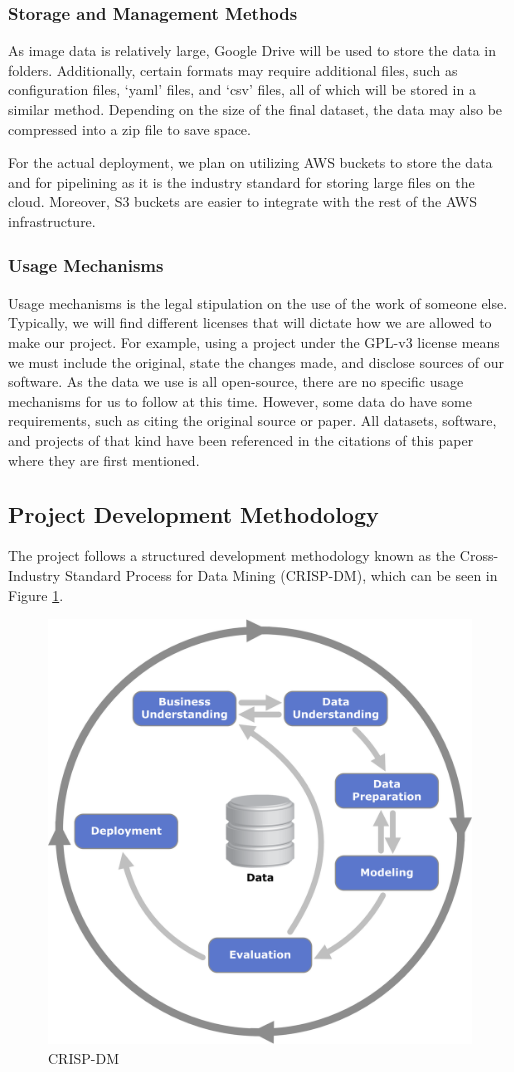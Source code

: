 \documentclass[stu,12pt,floatsintext]{apa7}
\begin{document}
\subsubsection{Storage and Management Methods}
As image data is relatively large, Google Drive will be used to store the data in folders. Additionally, certain formats may require additional files, such as configuration files, `yaml' files, and `csv' files, all of which will be stored in a similar method. Depending on the size of the final dataset, the data may also be compressed into a zip file to save space.

For the actual deployment, we plan on utilizing AWS buckets to store the data and for pipelining as it is the industry standard for storing large files on the cloud. Moreover, S3 buckets are easier to integrate with the rest of the AWS infrastructure.

\subsubsection{Usage Mechanisms}
Usage mechanisms is the legal stipulation on the use of the work of someone else. Typically, we will find different licenses that will dictate how we are allowed to make our project. For example, using a project under the GPL-v3 license means we must include the original, state the changes made, and disclose sources of our software. As the data we use is all open-source, there are no specific usage mechanisms for us to follow at this time. However, some data do have some requirements, such as citing the original source or paper. All datasets, software, and projects of that kind have been referenced in the citations of this paper where they are first mentioned.


\subsection{Project Development Methodology}
The project follows a structured development methodology known as the Cross-Industry Standard Process for Data Mining (CRISP-DM), which can be seen in Figure \ref{fig:crispdm}.

\begin{figure}[!htb]
	\centering
	\includegraphics[width=0.5\linewidth]{./images/CRISP-DM.png}
	\caption{CRISP-DM}
	\label{fig:crispdm}
\end{figure}
\end{document}
